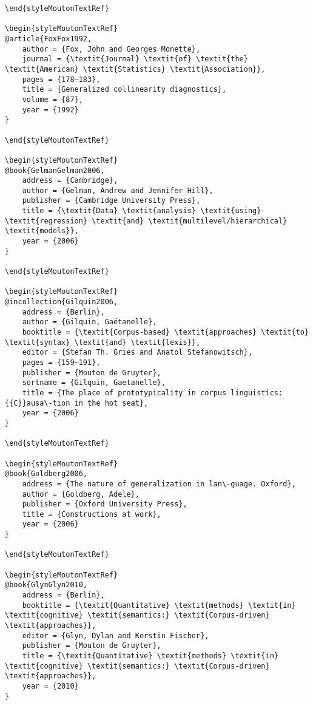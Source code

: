 \begin{styleMoutonHeadingi}
\begin{verbatim}
\end{styleMoutonTextRef}

\begin{styleMoutonTextRef}
@article{FoxFox1992,
	author = {Fox, John and Georges Monette},
	journal = {\textit{Journal} \textit{of} \textit{the} \textit{American} \textit{Statistics} \textit{Association}},
	pages = {178–183},
	title = {Generalized collinearity diagnostics},
	volume = {87},
	year = {1992}
}

\end{styleMoutonTextRef}

\begin{styleMoutonTextRef}
@book{GelmanGelman2006,
	address = {Cambridge},
	author = {Gelman, Andrew and Jennifer Hill},
	publisher = {Cambridge University Press},
	title = {\textit{Data} \textit{analysis} \textit{using} \textit{regression} \textit{and} \textit{multilevel/hierarchical} \textit{models}},
	year = {2006}
}

\end{styleMoutonTextRef}

\begin{styleMoutonTextRef}
@incollection{Gilquin2006,
	address = {Berlin},
	author = {Gilquin, Gaëtanelle},
	booktitle = {\textit{Corpus-based} \textit{approaches} \textit{to} \textit{syntax} \textit{and} \textit{lexis}},
	editor = {Stefan Th. Gries and Anatol Stefanowitsch},
	pages = {159–191},
	publisher = {Mouton de Gruyter},
	sortname = {Gilquin, Gaetanelle},
	title = {The place of prototypicality in corpus linguistics: {{C}}ausa\-tion in the hot seat},
	year = {2006}
}

\end{styleMoutonTextRef}

\begin{styleMoutonTextRef}
@book{Goldberg2006,
	address = {The nature of generalization in lan\-guage. Oxford},
	author = {Goldberg, Adele},
	publisher = {Oxford University Press},
	title = {Constructions at work},
	year = {2006}
}

\end{styleMoutonTextRef}

\begin{styleMoutonTextRef}
@book{GlynGlyn2010,
	address = {Berlin},
	booktitle = {\textit{Quantitative} \textit{methods} \textit{in} \textit{cognitive} \textit{semantics:} \textit{Corpus-driven} \textit{approaches}},
	editor = {Glyn, Dylan and Kerstin Fischer},
	publisher = {Mouton de Gruyter},
	title = {\textit{Quantitative} \textit{methods} \textit{in} \textit{cognitive} \textit{semantics:} \textit{Corpus-driven} \textit{approaches}},
	year = {2010}
}


\end{verbatim}
\end{styleMoutonHeadingi}
